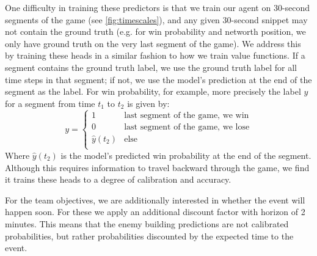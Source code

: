 \documentclass[ocean-paper.tex]{subfiles}
\begin{document}
One difficulty in training these predictors is that we train our agent on 30-second segments of the game (see \autoref{fig:timescales}), and any given 30-second snippet may not contain the ground truth (e.g. for win probability and networth position, we only have ground truth on the very last segment of the game).
We address this by training these heads in a similar fashion to how we train value functions.
If a segment contains the ground truth label, we use the ground truth label for all time steps in that segment; if not, we use the model's prediction at the end of the segment as the label.
For win probability, for example, more precisely the label $y$ for a segment from time $t_1$ to $t_2$ is given by:
\begin{equation}
    y = \left\{
        \begin{array}{ll}
            1 & \textrm{last segment of the game, we win} \\
            0 & \textrm{last segment of the game, we lose} \\
            \hat{y}(t_2) & \textrm{else} \\
        \end{array}
    \right.
\end{equation}
Where $\hat{y}(t_2)$ is the model's predicted win probability at the end of the segment.
Although this requires information to travel backward through the game, we find it trains these heads to a degree of calibration and accuracy.

For the team objectives, we are additionally interested in whether the event will happen soon. 
For these we apply an additional discount factor with horizon of 2 minutes.
This means that the enemy building predictions are not calibrated probabilities, but rather probabilities discounted by the expected time to the event.
\end{document}
